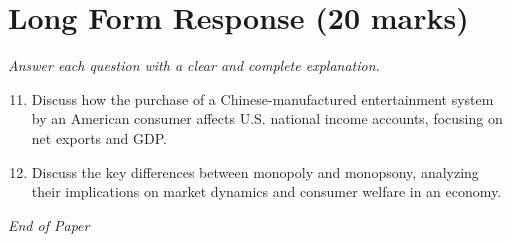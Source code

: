 \documentclass[12pt]{article}
\begin{document}
\section*{Long Form Response (20 marks)}
\textit{Answer each question with a clear and complete explanation.}
\begin{enumerate}[label=\arabic*.]
\setcounter{enumi}{10}
\item Discuss how the purchase of a Chinese-manufactured entertainment system by an American consumer affects U.S. national income accounts, focusing on net exports and GDP.
\item Discuss the key differences between monopoly and monopsony, analyzing their implications on market dynamics and consumer welfare in an economy.
\end{enumerate}

\vfill
\noindent\textit{End of Paper}
\end{document}
